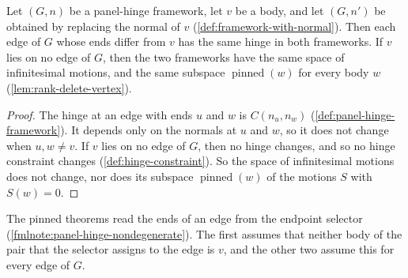 \begin{lemma}
  \label{lem:with-normal-preserves}
  \leanok
  Let $(G, n)$ be a panel-hinge framework, let $v$ be a body, and let
  $(G, n')$ be obtained by replacing the normal of $v$
  (\cref{def:framework-with-normal}). Then each edge of $G$ whose ends
  differ from $v$ has the same hinge in both frameworks. If $v$ lies on
  no edge of $G$, then the two frameworks have the same space of
  infinitesimal motions, and the same subspace
  $\operatorname{pinned}(w)$ for every body $w$
  (\cref{lem:rank-delete-vertex}).
\end{lemma}
\begin{proof}
  \leanok
  The hinge at an edge with ends $u$ and $w$ is $C(n_u, n_w)$
  (\cref{def:panel-hinge-framework}). It depends only on the normals at
  $u$ and $w$, so it does not change when $u, w \neq v$. If $v$ lies on
  no edge of $G$, then no hinge changes, and so no hinge constraint
  changes (\cref{def:hinge-constraint}). So the space of infinitesimal
  motions does not change, nor does its subspace
  $\operatorname{pinned}(w)$ of the motions $S$ with $S(w) = 0$.
\end{proof}

\begin{fmlnote}
  The pinned theorems read the ends of an edge from the endpoint
  selector (\cref{fmlnote:panel-hinge-nondegenerate}). The first assumes
  that neither body of the pair that the selector assigns to the edge is
  $v$, and the other two assume this for every edge of $G$.
\end{fmlnote}

